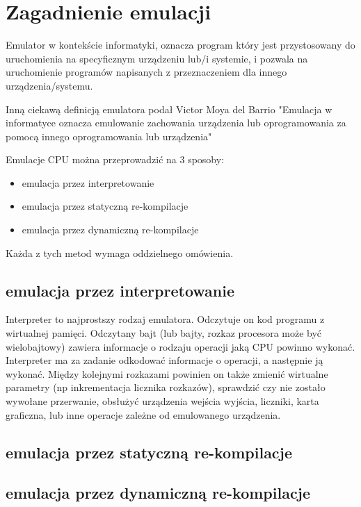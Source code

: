 \chapter{Zagadnienie emulacji}
	
	Emulator w kontekście informatyki, oznacza program który jest przystosowany do uruchomienia na specyficznym urządzeniu lub/i systemie, i pozwala na uruchomienie programów napisanych z przeznaczeniem dla innego urządzenia/systemu. \cite{howDoIWriteAnEmulator}
	
	Inną ciekawą definicją emulatora podał Victor Moya del Barrio "Emulacja w informatyce oznacza emulowanie zachowania urządzenia lub oprogramowania za pomocą innego oprogramowania lub urządzenia" %
	\cite{studyofthetechniquesforemulationprogramming}
		
	Emulacje CPU można przeprowadzić na 3 sposoby:\cite{fms_komkon_org_howto}	
	\begin{itemize}  
		\item emulacja przez interpretowanie
		\item emulacja przez statyczną re-kompilacje
		\item emulacja przez dynamiczną re-kompilacje
	\end{itemize} 
	Każda z tych metod wymaga oddzielnego omówienia.
	
	\section{emulacja przez interpretowanie}
	Interpreter to najprostszy rodzaj emulatora. Odczytuje on kod programu z wirtualnej pamięci. Odczytany bajt (lub bajty, rozkaz procesora może być wielobajtowy) zawiera informacje o rodzaju operacji jaką CPU powinno wykonać. Interpreter ma za zadanie odkodować informacje o operacji, a następnie ją wykonać. Między kolejnymi rozkazami powinien on także zmienić wirtualne parametry (np inkrementacja licznika rozkazów), sprawdzić czy nie zostało wywołane przerwanie, obsłużyć urządzenia wejścia wyjścia, liczniki, karta graficzna, lub inne operacje zależne od emulowanego urządzenia.
	
	
	
	\section{emulacja przez statyczną re-kompilacje}
	\section{emulacja przez dynamiczną re-kompilacje}
	
